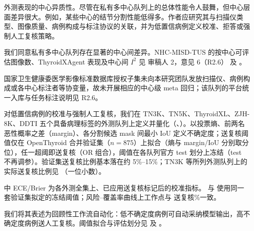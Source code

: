\begin{reviewercomment}
外测表现的中心异质性。尽管在私有多中心队列上的总体性能令人鼓舞，但中心层面差异很大。例如，某些中心的结节分割性能低得多。作者应研究其与扫描仪类型、图像质量、病例构成与标注协议的关联，并为低置信病例定义校准、拒答或强制人工复核策略。
\end{reviewercomment}
\begin{authorresponse}
我们同意私有多中心队列存在显著的中心间差异。NHC-MISD-TUS 的按中心可评估图像数、ThyroidXAgent 表现及中心间 $I^2$ 见 审稿人 2，意见 6（R2.6） 及 。\par
国家卫生健康委医学影像标准数据库授权子集未向本研究团队发放扫描仪、病例构成或各中心标注者等协变量，故未开展相应的中心级 meta 回归；该队列的平台统一入库与任务标注说明见 R2.6。\par
对低置信病例的校准与强制人工复核，我们在 TN3K、TN5K、ThyroidXL、ZJH-8K、DDTI 五个具备病理标签的外测队列上定义并量化（、）。以投票熵、前两名恶性概率之差（margin）、各分割候选 mask 间最小 IoU 定义不确定度；送复核阈值仅在 OpenThyroid 合并验证集（$n{=}875$）上拟合（熵与 margin/IoU 分别取分位），任一超阈即送复核（OR 组合），阈值在各队列官方 test 划分上冻结（test 不再调参）。验证集送复核比例基本落在约 5\%--15\%；TN3K 等所列外测队列上的实际送复核比例见 （一位小数）。\par
{} 中 ECE/Brier 为各外测全集上、已应用送复核标记后的校准指标。 与  使用同一套验证集拟定的冻结阈值；风险–覆盖率曲线上工作点与  送复核\%一致。\par
我们将其表述为回顾性工作流自动化：低不确定度病例可自动采纳模型输出，高不确定度病例送人工复核。阈值拟合与评估划分见  及 。\par
\par
\end{authorresponse}

